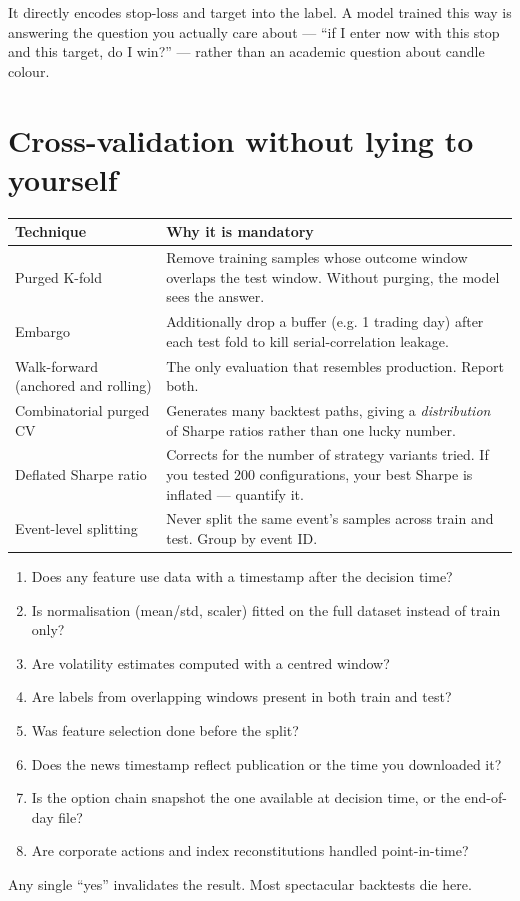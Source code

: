 \begin{keybox}[title={Why triple-barrier changes the product}]
It directly encodes stop-loss and target into the label. A model trained this way
is answering the question you actually care about --- ``if I enter now with this
stop and this target, do I win?'' --- rather than an academic question about
candle colour.
\end{keybox}

\section{Cross-validation without lying to yourself}

\begin{longtable}{@{}p{3.8cm}p{10.8cm}@{}}
\toprule
\textbf{Technique} & \textbf{Why it is mandatory}\\
\midrule
Purged K-fold & Remove training samples whose outcome window overlaps the test
window. Without purging, the model sees the answer.\\
Embargo & Additionally drop a buffer (e.g. 1 trading day) after each test fold
to kill serial-correlation leakage.\\
Walk-forward (anchored and rolling) & The only evaluation that resembles
production. Report both.\\
Combinatorial purged CV & Generates many backtest paths, giving a
\emph{distribution} of Sharpe ratios rather than one lucky number.\\
Deflated Sharpe ratio & Corrects for the number of strategy variants tried.
If you tested 200 configurations, your best Sharpe is inflated --- quantify it.\\
Event-level splitting & Never split the same event's samples across train and
test. Group by event ID.\\
\bottomrule
\end{longtable}

\begin{warnbox}[title={Leakage checklist --- run before believing any result}]
\begin{enumerate}
\item Does any feature use data with a timestamp after the decision time?
\item Is normalisation (mean/std, scaler) fitted on the full dataset instead of
train only?
\item Are volatility estimates computed with a centred window?
\item Are labels from overlapping windows present in both train and test?
\item Was feature selection done before the split?
\item Does the news timestamp reflect publication or the time you downloaded it?
\item Is the option chain snapshot the one available at decision time, or the
end-of-day file?
\item Are corporate actions and index reconstitutions handled point-in-time?
\end{enumerate}
Any single ``yes'' invalidates the result. Most spectacular backtests die here.
\end{warnbox}

